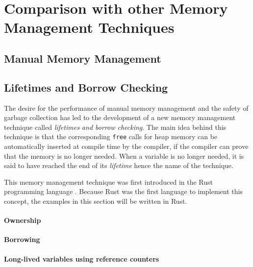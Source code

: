 \chapter{Comparison with other Memory Management Techniques}

\section{Manual Memory Management}

\section{Lifetimes and Borrow Checking}

The desire for the performance of manual memory management and the safety of garbage collection has led to the development
of a new memory management technique called \textit{lifetimes and borrow checking}.
The main idea behind this technique is that the corresponding \texttt{free} calls for heap memory can be automatically inserted
at compile time by the compiler, if the compiler can prove that the memory is no longer needed.
When a variable is no longer needed, it is said to have reached the end of its \textit{lifetime} hence the name of the technique.

This memory management technique was first introduced in the Rust programming language \cite[1. Introduction]{rust_borrow_formalism_2021}.
Because Rust was the first language to implement this concept, the examples in this section will be written in Rust.

\subsubsection{Ownership}

\subsubsection{Borrowing}

\subsubsection{Long-lived variables using reference counters}
